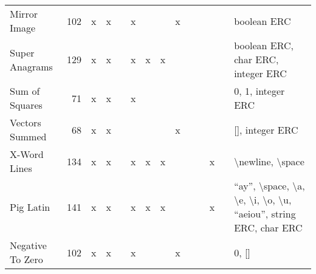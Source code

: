\documentclass{sig-alternate}
\begin{document}
\begin{table*}
\begin{tabular}{>{\raggedright}p{2.6cm}rccccccccccc>{\raggedright}p{5.5cm}}
Mirror Image               & 102             & x    & x       &       & x       &      &        & x                  &                  &                   &       &            & boolean ERC                                                                                                                                                                                                                 \tabularnewline
Super Anagrams             & 129             & x    & x       &       & x       & x    & x      &                    &                  &                   &       &            & boolean ERC, char ERC, integer ERC                                                                                                                                                                                          \tabularnewline
Sum of Squares             & 71              & x    & x       &       & x       &      &        &                    &                  &                   &       &            & 0, 1, integer ERC                                                                                                                                                                                                           \tabularnewline
Vectors Summed             & 68              & x    & x       &       &         &      &        & x                  &                  &                   &       &            & {[}{]}, integer ERC                                                                                                                                                                                                         \tabularnewline
X-Word Lines               & 134             & x    & x       &       & x       & x    & x      &                    &                  &                   & x     &            & \textbackslash newline, \textbackslash space                                                                                                                                                                                \tabularnewline
Pig Latin                  & 141             & x    & x       &       & x       & x    & x      &                    &                  &                   & x     &            & ``ay'', \textbackslash space, \textbackslash a, \textbackslash e, \textbackslash i, \textbackslash o, \textbackslash u, ``aeiou'', string ERC, char ERC                                                                         \tabularnewline
Negative To Zero           & 102             & x    & x       &       & x       &      &        & x                  &                  &                   &       &            & 0, {[}{]}                                                                                                                                                                                                                   \tabularnewline

\end{tabular}
\end{table*}
\end{document}
